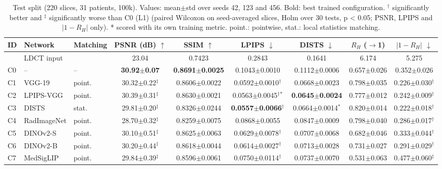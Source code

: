 \begin{table}[t]
\centering
\footnotesize
\setlength{\tabcolsep}{3pt}
\caption{Test split (220 slices, 31 patients, 100k). Values: mean$\pm$std over seeds 42, 123 and 456. Bold: best trained configuration. $^{\dagger}$ significantly better and $^{\ddagger}$ significantly worse than C0 (L1) (paired Wilcoxon on seed-averaged slices, Holm over 30 tests, p < 0.05; PSNR, LPIPS and $|1-R_H|$ only). * scored with its own training metric. point.: pointwise, stat.: local statistics matching.}
\label{tab:results}
\begin{tabular}{lllcccccc}
\toprule
ID & Network & Matching & PSNR (dB) $\uparrow$ & SSIM $\uparrow$ & LPIPS $\downarrow$ & DISTS $\downarrow$ & $R_H$ ($\to$1) & $|1-R_H|$ $\downarrow$ \\
\midrule
 & LDCT input &  & 23.04 & 0.7423 & 0.2843 & 0.1641 & 6.174 & 5.275 \\
C0 & -- & -- & \textbf{30.92$\pm$0.07} & \textbf{0.8691$\pm$0.0025} & 0.1043$\pm$0.0010 & 0.1112$\pm$0.0006 & 0.657$\pm$0.026 & 0.352$\pm$0.026 \\
C1 & VGG-19 & point. & 30.32$\pm$0.22$^{\ddagger}$ & 0.8606$\pm$0.0022 & 0.0592$\pm$0.0010$^{\dagger}$ & 0.0668$\pm$0.0023 & 0.798$\pm$0.035 & 0.226$\pm$0.030$^{\dagger}$ \\
C2 & LPIPS-VGG & point. & 30.39$\pm$0.31$^{\ddagger}$ & 0.8630$\pm$0.0021 & 0.0563$\pm$0.0045$^{\dagger}${}$^{*}$ & \textbf{0.0645$\pm$0.0024} & 0.777$\pm$0.012 & 0.242$\pm$0.009$^{\dagger}$ \\
C3 & DISTS & stat. & 29.81$\pm$0.20$^{\ddagger}$ & 0.8326$\pm$0.0244 & \textbf{0.0557$\pm$0.0066}$^{\dagger}$ & 0.0664$\pm$0.0014$^{*}$ & 0.820$\pm$0.014 & 0.222$\pm$0.018$^{\dagger}$ \\
C4 & RadImageNet & point. & 28.70$\pm$0.32$^{\ddagger}$ & 0.8259$\pm$0.0075 & 0.0868$\pm$0.0055 & 0.0847$\pm$0.0009 & 0.798$\pm$0.040 & 0.286$\pm$0.017$^{\dagger}$ \\
C5 & DINOv2-S & point. & 30.10$\pm$0.51$^{\ddagger}$ & 0.8625$\pm$0.0063 & 0.0629$\pm$0.0078$^{\dagger}$ & 0.0707$\pm$0.0068 & 0.682$\pm$0.046 & 0.333$\pm$0.044$^{\dagger}$ \\
C6 & DINOv2-B & point. & 30.20$\pm$0.44$^{\ddagger}$ & 0.8618$\pm$0.0044 & 0.0614$\pm$0.0027$^{\dagger}$ & 0.0713$\pm$0.0028 & 0.731$\pm$0.027 & 0.291$\pm$0.029$^{\dagger}$ \\
C7 & MedSigLIP & point. & 29.84$\pm$0.39$^{\ddagger}$ & 0.8596$\pm$0.0061 & 0.0750$\pm$0.0114$^{\dagger}$ & 0.0737$\pm$0.0070 & 0.531$\pm$0.063 & 0.477$\pm$0.060$^{\ddagger}$ \\

\end{tabular}
\end{table}
